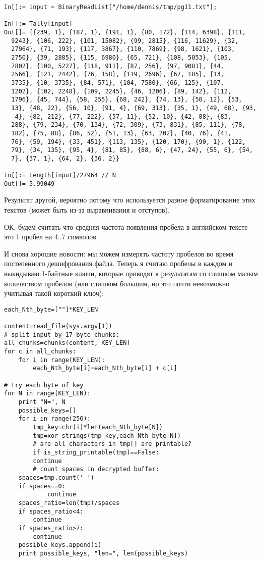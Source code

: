 \begin{lstlisting}[caption=Mathematica,style=custommath]
In[]:= input = BinaryReadList["/home/dennis/tmp/pg11.txt"];

In[]:= Tally[input]
Out[]= {{239, 1}, {187, 1}, {191, 1}, {80, 172}, {114, 6398}, {111, 
  9243}, {106, 222}, {101, 15082}, {99, 2815}, {116, 11629}, {32, 
  27964}, {71, 193}, {117, 3867}, {110, 7869}, {98, 1621}, {103, 
  2750}, {39, 2885}, {115, 6980}, {65, 721}, {108, 5053}, {105, 
  7802}, {100, 5227}, {118, 911}, {87, 256}, {97, 9081}, {44, 
  2566}, {121, 2442}, {76, 158}, {119, 2696}, {67, 185}, {13, 
  3735}, {10, 3735}, {84, 571}, {104, 7580}, {66, 125}, {107, 
  1202}, {102, 2248}, {109, 2245}, {46, 1206}, {89, 142}, {112, 
  1796}, {45, 744}, {58, 255}, {68, 242}, {74, 13}, {50, 12}, {53, 
  13}, {48, 22}, {56, 10}, {91, 4}, {69, 313}, {35, 1}, {49, 68}, {93,
   4}, {82, 212}, {77, 222}, {57, 11}, {52, 10}, {42, 88}, {83, 
  288}, {79, 234}, {70, 134}, {72, 309}, {73, 831}, {85, 111}, {78, 
  182}, {75, 88}, {86, 52}, {51, 13}, {63, 202}, {40, 76}, {41, 
  76}, {59, 194}, {33, 451}, {113, 135}, {120, 170}, {90, 1}, {122, 
  79}, {34, 135}, {95, 4}, {81, 85}, {88, 6}, {47, 24}, {55, 6}, {54, 
  7}, {37, 1}, {64, 2}, {36, 2}}

In[]:= Length[input]/27964 // N
Out[]= 5.99049
\end{lstlisting}

Результат другой, вероятно потому что используется разное форматирование этих текстов (может быть из-за выравнивания
и отступов).

ОК, будем считать что средняя частота появления пробела в английском тексте это 1 пробел на 4..7 символов.

И снова хорошие новости: мы можем измерять частоту пробелов во время постепенного дешифрования файла.
Теперь я считаю пробелы в каждом  и выкидываю 1-байтные ключи, которые приводят к результатам со слишком
малым количеством пробелов
(или слишком большим, но это почти невозможно учитывая такой короткий ключ):

\begin{lstlisting}[caption=Python script,style=custompy]
each_Nth_byte=[""]*KEY_LEN

content=read_file(sys.argv[1])
# split input by 17-byte chunks:
all_chunks=chunks(content, KEY_LEN)
for c in all_chunks:
    for i in range(KEY_LEN):
        each_Nth_byte[i]=each_Nth_byte[i] + c[i]

# try each byte of key
for N in range(KEY_LEN):
    print "N=", N
    possible_keys=[]
    for i in range(256):
        tmp_key=chr(i)*len(each_Nth_byte[N])
        tmp=xor_strings(tmp_key,each_Nth_byte[N])
        # are all characters in tmp[] are printable?
        if is_string_printable(tmp)==False:
	    continue
        # count spaces in decrypted buffer:
	spaces=tmp.count(' ')
	if spaces==0:
            continue
	spaces_ratio=len(tmp)/spaces
	if spaces_ratio<4:
	    continue
	if spaces_ratio>7:
	    continue
	possible_keys.append(i)
    print possible_keys, "len=", len(possible_keys)
\end{lstlisting}


